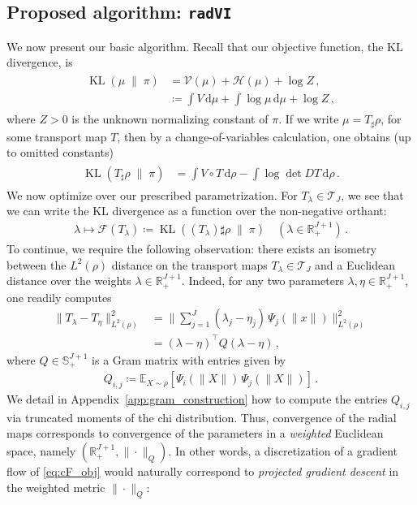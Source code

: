 \documentclass[twoside]{article}
\newcommand{\cF}{\mathcal{F}}
\newcommand{\cH}{\mathcal{H}}
\newcommand{\cT}{\mathcal{T}}
\newcommand{\cV}{\mathcal{V}}
\newcommand{\1}{\mathds{1}}
\newcommand{\kl}[2]{\KL(#1 \!\;\|\; \!#2)}
\newcommand{\R}{\mathbb{R}}
\newcommand*{\E}{\mathbb E}
\newcommand*{\defeq}{\coloneqq}
\newcommand*{\rd}{\mathrm{d}}
\newcommand*{\dd}{\, \rd}
\DeclareMathOperator*{\KL}{KL}
\theoremstyle{plain}
\theoremstyle{definition}
\theoremstyle{remark}
\begin{document}
\subsection{Proposed algorithm: \texttt{radVI}}\label{sec:algo}
We now present our basic algorithm. Recall that our objective function, the KL divergence, is
\begin{align*}
\begin{split}
    \kl{\mu}{\pi} &= \cV(\mu) + \cH(\mu) + \log Z\,, \\
    &\defeq \int V \dd \mu + \int \log \mu \dd \mu + \log Z\,,
\end{split}
\end{align*}
where $Z > 0$ is the unknown normalizing constant of $\pi$. If we write $\mu = T_\sharp\rho$, for some transport map $T$, then by a change-of-variables calculation, one obtains (up to omitted constants)
\begin{align*}
\begin{split}
        \kl{T_\sharp\rho}{\pi} &= \int V\circ T\dd \rho
        - \int \log \det  DT \dd \rho\,.
\end{split}
\end{align*}
We now optimize over our prescribed parametrization. For $T_\lambda \in \cT_J$, we see that we can write the KL divergence as a function over the non-negative orthant:
\begin{align}\label{eq:cF_obj}
\lambda \mapsto \cF(T_\lambda) \defeq \kl{(T_\lambda)\sharp\rho}{\pi} \quad (\lambda \in \R^{J+1}_+)\,.
\end{align}
To continue, we require the following observation: there exists an isometry between the $L^2(\rho)$ distance on the transport maps $T_\lambda \in \cT_J$ and a Euclidean distance over the weights $\lambda \in \R^{J+1}_+$. Indeed, for any two parameters $\lambda,\eta \in \R^{J+1}_+$, one readily computes
\begin{align*}
\|T_\lambda - T_\eta\|^2_{L^2(\rho)}
&= \|\textstyle\sum_{j=1}^J(\lambda_j - \eta_j)\,\Psi_j(\|x\|)\|^2_{L^2(\rho)} \\
&= (\lambda - \eta)^\top Q(\lambda - \eta)\,,
\end{align*}
where $Q \in \mathbb{S}^{J+1}_{+}$ is a Gram matrix with entries given by
\begin{align*}
    Q_{i,j} \defeq \E_{X \sim \rho}[\Psi_i(\|X\|)\,\Psi_j(\|X\|)]\,.
\end{align*}
{We detail in Appendix~\ref{app:gram_construction} how to compute the entries $Q_{i,j}$ via truncated moments of the chi distribution.} Thus, convergence of the radial maps corresponds to convergence of the parameters in a \emph{weighted} Euclidean space, namely $(\R^{J+1}_+,\|\cdot\|_Q)$. In other words, a discretization of a gradient flow of \eqref{eq:cF_obj} would naturally correspond to \emph{projected gradient descent} in the weighted metric $\|\cdot\|_Q$:
\end{document}
